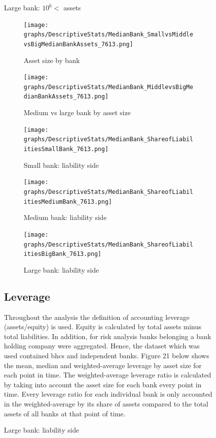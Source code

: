 \documentclass[12pt, a4paper]{article} %
\begin{document}
\begin{figure}[hbtp]
Large bank: $10^6<$ assets 

\begin{figure}[hbtp]
\centering
\caption{Asset size by bank}
\texttt{[image: graphs/DescriptiveStats/MedianBank\_SmallvsMiddlevsBigMedianBankAssets\_7613.png]}
\end{figure}

\begin{figure}[hbtp]
\centering
\caption{Medium vs large bank by asset size}
\texttt{[image: graphs/DescriptiveStats/MedianBank\_MiddlevsBigMedianBankAssets\_7613.png]}
\end{figure}


\begin{figure}[hbtp]
\centering
\caption{Small bank: liability side}
\texttt{[image: graphs/DescriptiveStats/MedianBank\_ShareofLiabilitiesSmallBank\_7613.png]}
\end{figure}


\begin{figure}[hbtp]
\centering
\caption{Medium bank: liability side}
\texttt{[image: graphs/DescriptiveStats/MedianBank\_ShareofLiabilitiesMediumBank\_7613.png]}
\end{figure}


\begin{figure}[hbtp]
\centering
\caption{Large bank: liability side}
\texttt{[image: graphs/DescriptiveStats/MedianBank\_ShareofLiabilitiesBigBank\_7613.png]}
\end{figure}



\newpage

\subsection{Leverage}

Throughout the analysis the definition of accounting leverage (assets/equity) is used. Equity is calculated by total assets minus total liabilities. In addition, for risk analysis banks belonging a bank holding company were aggregated. Hence, the dataset which was used contained bhcs and independent banks. Figure 21 below shows the mean, median and weighted-average leverage by asset size for each point in time. The weighted-average leverage ratio is calculated by taking into account the asset size for each bank every point in time. Every leverage ratio for each individual bank is only accounted in the weighted-average by its share of assets compared to the total assets of all banks at that point of time.


\end{figure}
\end{document}
